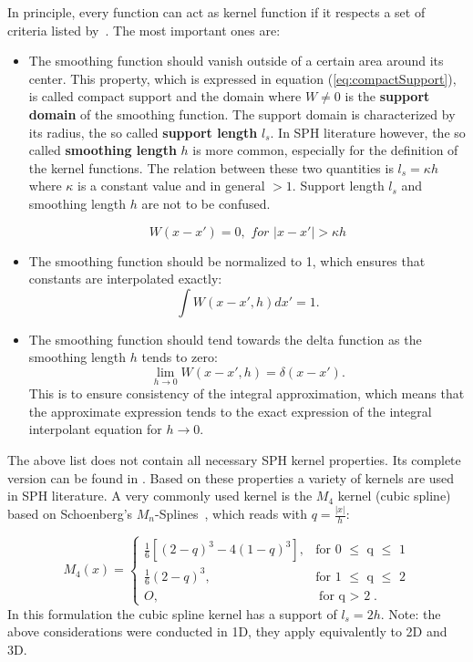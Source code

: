\documentclass[11pt,a4paper,twoside]{report}
\newcommand{\norm}[1]{\left|#1\right|}
\begin{document}
In principle, every function can act as kernel function
if it respects a set of criteria listed by~\cite{Liu2003}.
The most important ones are:
\begin{itemize}
\item The smoothing function should vanish outside of a certain area around its
center. This property, which is expressed in equation (\ref{eq:compactSupport}), is called compact support and the domain where $W\neq0$
is the {\bf support domain} of the smoothing function.  The support domain is characterized by its radius, the so called {\bf support length} $l_s$. In SPH literature however, the so called {\bf smoothing length} $h$ is more common, especially for the definition of the kernel functions. The relation between these two quantities is $l_s=\kappa h$ where $\kappa$ is a constant value and in general $>1$. Support length $l_s$ and smoothing length $h$ are not to be confused.
 
\begin{equation}
\label{eq:compactSupport}
W(x-x')=0,\textit{ \ for \ }|x-x'|>\kappa h
\end{equation}

\item The smoothing function should be normalized to 1, which ensures that constants
are interpolated exactly:
\begin{equation}
\int{W(x-x',h)dx'}=1.
\end{equation}

\item The smoothing function should tend towards the delta function as the smoothing
length $h$ tends to zero:
\begin{equation}
\lim\limits_{h \rightarrow 0}{W(x-x',h)}=\delta(x-x').
\end{equation}
This is to ensure consistency of the integral approximation, which means that
the approximate expression tends to the exact expression of the integral
interpolant equation for $h \rightarrow 0$.
\end{itemize}
The above list does not contain all necessary SPH kernel properties. Its complete version can be found in \cite{Liu2003}.
Based on these properties a variety of kernels are used in SPH literature. A
very commonly used kernel is the $M_4$ kernel (cubic spline) based on Schoenberg's
$M_n$-Splines~\cite{Schoenberg1946}, which reads with $q=\frac{\norm{x}}{h}$:

\begin{equation}
\label{eq:cubicSpline}
M_{4}(x)=\begin{cases}
\frac{1}{6}[(2-q)^{3}-4(1-q)^{3}],& \text{for 0 $\leq$ q $\leq$ 1} \\
\frac{1}{6}(2-q)^{3},&  \text{for 1 $\leq$ q $\leq$ 2} \\
O,& \text{for q $>$ 2}.
\end{cases}
\end{equation}
In this formulation the cubic spline kernel has a support of $l_s=2h$.				
Note: the above considerations were conducted in 1D, they apply equivalently to 2D and 3D.
\end{document}
